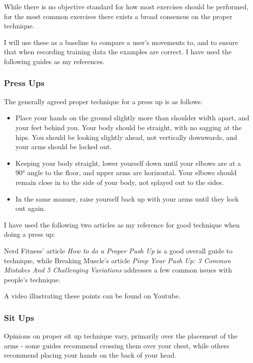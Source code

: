 \documentclass[a4paper]{article}
\begin{document}
While there is no objective standard for how most exercises should be performed, for the most common exercises there exists a broad consensus on the proper technique.

I will use these as a baseline to compare a user's movements to, and to ensure that when recording training data the examples are correct. I have used the following guides as my references.

\subsubsection{Press Ups}

The generally agreed proper technique for a press up is as follows:

\begin{itemize}
    \item Place your hands on the ground slightly more than shoulder width apart, and your feet behind you. Your body should be straight, with no sagging at the hips. You should be looking slightly ahead, not vertically downwards, and your arms should be locked out.
    \item Keeping your body straight, lower yourself down until your elbows are at a 90° angle to the floor, and upper arms are horizontal. Your elbows should remain close in to the side of your body, not splayed out to the sides.
    \item In the same manner, raise yourself back up with your arms until they lock out again.
\end{itemize}

I have used the following two articles as my reference for good technique when doing a press up:

Nerd Fitness' article \textit{How to do a Proper Push Up}\cite{bgref16}
is a good overall guide to technique, while Breaking Muscle's article \textit{Pimp Your Push Up: 3 Common Mistakes And 5 Challenging Variations}\cite{bgref17} addresses a few common issues with people's technique.

A video illustrating these points can be found on Youtube.\cite{bgref18}

\subsubsection{Sit Ups}

Opinions on proper sit up technique vary, primarily over the placement of the arms - some guides recommend crossing them over your chest, while others recommend placing your hands on the back of your head. 
\end{document}
